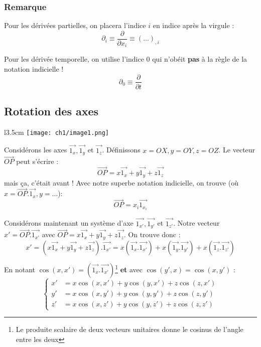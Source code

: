 \subsubsection{Remarque}
Pour les dérivées partielles, on placera l'indice $i$ en indice après la virgule :
\begin{equation}
	\partial_i \equiv \frac{\partial}{\partial x_i} \equiv (\dots)_{,i}
\end{equation}
        
Pour les dérivée temporelle, on utilise l'indice 0 qui n'obéit \textbf{pas} à la
règle de la notation indicielle ! 
\begin{equation}
	\partial_0 \equiv \frac{\partial}{\partial t}
\end{equation}


\newpage
\subsection{Rotation des axes}
\begin{wrapfigure}[7]{l}{3.5cm}
	\texttt{[image: ch1/image1.png]}
\end{wrapfigure}
Considérons les axes $\vec{1_x}, \vec{1_y}$ et $\vec{1_z}$. Définissons $x = OX, y = OY, 
z = OZ$. Le vecteur $\vec{OP}$ peut s'écrire :
\begin{equation}
	\vec{OP} = x\vec{1_x} + y\vec{1_y}+z\vec{1_z}
\end{equation}
mais ça, c'était avant ! Avec notre superbe notation indicielle, on trouve (où $x = \vec{OP}.
\vec{1_x}, y = \dots$):
\begin{equation}
	\vec{OP} = x_i\vec{1_{x_i}}
\end{equation}
    
Considérons maintenant un système d'axe $\vec{1_{x'}}, \vec{1_{y'}}$ et $\vec{1_{z'}}$. Notre
vecteur $x' = \vec{OP}.\vec{1_{x'}}$ avec $\vec{OP} = x\vec{1_x} + y\vec{1_y}+z\vec{1_z}$. On
trouve donc :
\begin{equation}
	x' = ( x\vec{1_x} + y\vec{1_y}+z\vec{1_z}).\vec{1_{x'}} = x(\vec{1_x}.\vec{1_{x'}}) + x(\vec{1_y}
	.\vec{1_{y'}}) + x(\vec{1_z}.\vec{1_{z'}})
\end{equation}
    
En notant $\cos(x,x') = (\vec{1_x}.\vec{1_{x'}})$\footnote{Le produite scalaire de deux vecteurs
	unitaires donne le cosinus de l'angle entre les deux} \textbf{et} avec $\cos(y',x) = \cos(x,y')$ :
\begin{equation}
	\left\{\begin{array}{ll}
	x' &=  x\cos(x,x') + y\cos(y,x') + z\cos(z,x')\\
	y' &=  x\cos(x,y') + y\cos(y,y') + z\cos(z,y')\\ 
	z' &=  x\cos(x,z') + y\cos(y,z') + z\cos(z,z')
	\end{array}\right.
\end{equation}
    
